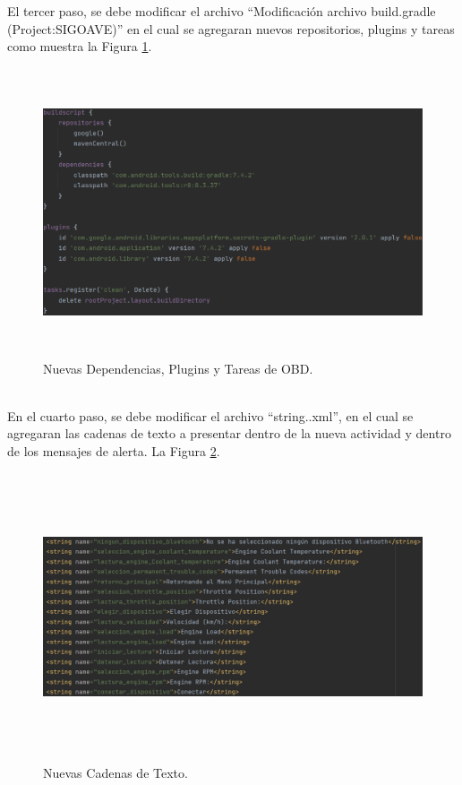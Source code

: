 \documentclass[a4paper,10pt, oneside, titlepage]{article}
\begin{document}
	\indent El tercer paso, se debe modificar el archivo ``Modificación archivo build.gradle (Project:SIGOAVE)'' en el cual se agregaran nuevos repositorios, plugins y tareas como muestra la Figura \ref{Nuevas_Tareas_OBD}.
	\begin{figure}[!h]
		\centering
		\includegraphics[width = 1\linewidth, height = 8.5cm]{Nuevas_Tareas_OBD.png}
		\caption{Nuevas Dependencias, Plugins y Tareas de OBD.}
		\label{Nuevas_Tareas_OBD}
	\end{figure} \\
	\indent En el cuarto paso, se debe modificar el archivo ``string..xml'', en el cual se agregaran las cadenas de texto a presentar dentro de la nueva actividad y dentro de los mensajes de alerta. La Figura \ref{String_Nuevo_OBD}.
	\begin{figure}[!h]
		\centering
		\includegraphics[width = 1\linewidth, height = 8.5cm]{String_Nuevo_OBD.png}
		\caption{Nuevas Cadenas de Texto.}
		\label{String_Nuevo_OBD}
	\end{figure} \\
\end{document}
